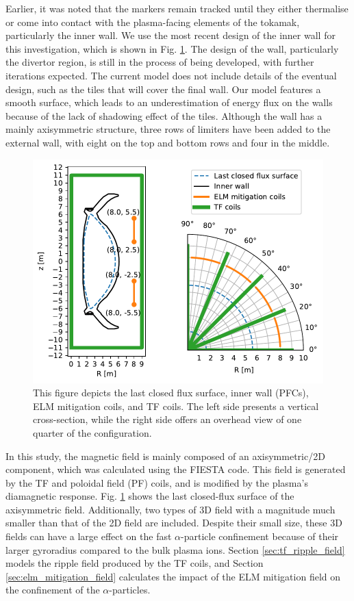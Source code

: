 \documentclass[10pt, a4paper, twoside]{article}
\begin{document}
Earlier, it was noted that the markers remain tracked until they either thermalise or come into contact with the plasma-facing elements of the tokamak, particularly the inner wall. We use the most recent design of the inner wall for this investigation, which is shown in Fig. \ref{fig:lcfs_wall_elm_tf_coils}. The design of the wall, particularly the divertor region, is still in the process of being developed, with further iterations expected. The current model does not include details of the eventual design, such as the tiles that will cover the final wall. Our model features a smooth surface, which leads to an underestimation of energy flux on the walls because of the lack of shadowing effect of the tiles. Although the wall has a mainly axisymmetric structure, three rows of limiters have been added to the external wall, with eight on the top and bottom rows and four in the middle.

\begin{figure}[!htb]
    \centering
    \includegraphics[width=0.6\linewidth]{Figures/lcfs_wall_elm_tf_coils.pdf}
    \caption{This figure depicts the last closed flux surface, inner wall (PFCs), ELM mitigation coils, and TF coils. The left side presents a vertical cross-section, while the right side offers an overhead view of one quarter of the configuration.}
    \label{fig:lcfs_wall_elm_tf_coils}
\end{figure}

In this study, the magnetic field is mainly composed of an axisymmetric/2D component, which was calculated using the FIESTA code. This field is generated by the TF and poloidal field (PF) coils, and is modified by the plasma's diamagnetic response. Fig. \ref{fig:lcfs_wall_elm_tf_coils} shows the last closed-flux surface of the axisymmetric field. Additionally, two types of 3D field with a magnitude much smaller than that of the 2D field are included. Despite their small size, these 3D fields can have a large effect on the fast $\alpha$-particle confinement because of their larger gyroradius compared to the bulk plasma ions. Section \ref{sec:tf_ripple_field} models the ripple field produced by the TF coils, and Section \ref{sec:elm_mitigation_field} calculates the impact of the ELM mitigation field on the confinement of the $\alpha$-particles.
\end{document}

